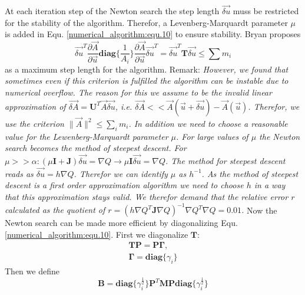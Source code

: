 At each iteration step of the Newton search the step length $\vec{\delta u}$ muss be restricted for the stability of the algorithm.
Therefor, a Levenberg-Marquardt parameter $\mu$ is added in Equ. \ref{numerical_algorithm:equ.10} to ensure stability.
Bryan proposes 
\begin{equation}
	\vec{\delta u}^T \frac{\partial \vec A}{\partial \vec u}\mathbf{diag}\{\frac{1}{A_i}\}\frac{\partial \vec A}{\partial \vec u}
	\vec{\delta u}^T = \vec{\delta u}^T \mathbf{T} \vec{\delta u} \leq \sum m_i
\end{equation}
as a maximum step length for the algorithm.\newline
Remark:\newline
\textit{However, we found that sometimes even if this criterion is fulfilled the algorithm can be instable due to numerical overflow. The reason for this we assume to be the invalid linear approximation of $\vec {\delta A} = \mathbf{U}^T \vec A\vec{\delta u}$, i.e. $\vec{\delta A} << \vec A(\vec u + \vec{\delta u}) - \vec A(\vec u)$. 
Therefor, we use the criterion $\parallel \vec A \parallel^2 \leq \sum_i m_i$. In addition we need to choose a reasonable value for the Lewenberg-Marquardt parameter $\mu$. For large values of $\mu$ the Newton search becomes the method of steepest descent. For $\mu >> \alpha: (\mu \mathbf{I} + \mathbf{J})\vec{\delta u} = \nabla Q \rightarrow \mu \mathbf{I} \vec{\delta u} = \nabla Q$. The method for steepest descent reads as $\vec{\delta u} = h \nabla Q$. Therefor we can identify $\mu$ as $h^{-1}$. As the method of steepest descent is a first order approximation algorithm we need to choose $h$ in a way that this approximation stays valid. We therefor demand that the relative error $r$ calculated as the quotient of $r = (h\nabla Q^T \mathbf{J}\nabla Q)^{-1}\nabla Q^T\nabla Q = 0.01$.}\newline
Now the Newton search can be made more efficient by diagonalizing Equ. \ref{numerical_algorithm:equ.10}. First we diagonalize $\mathbf{T}$:
\begin{equation}
	\begin{gathered}
		\mathbf{T} \mathbf{P} = \mathbf{P} \mathbf{\Gamma},\\
		\mathbf{\Gamma} = \mathbf{diag} \{\gamma_i\}
	\end{gathered}
	\label{numerical_algorithm:equ.11}
\end{equation}
Then we define
\begin{equation}
	\mathbf{B} = \mathbf{diag} \{ \gamma_i^{\frac{1}{2}}\}\mathbf{P}^T \mathbf{M}\mathbf{P}\mathbf{diag}\{ \gamma_i^{\frac{1}{2}}\}
	\label{numerical_algorithm:equ.12}
\end{equation}
